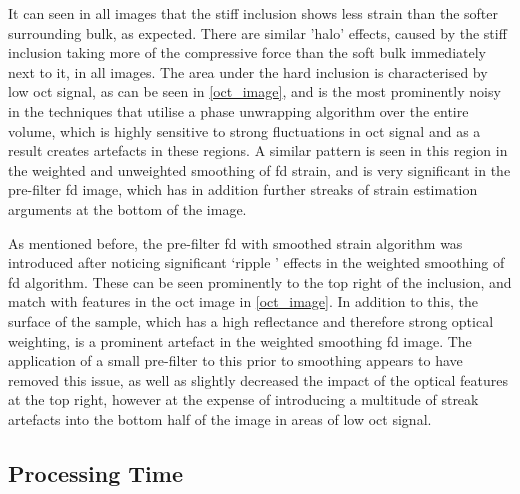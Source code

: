 It can seen in all images that the stiff inclusion shows less strain than the softer surrounding bulk, as expected. There are similar 'halo' effects, caused by the stiff inclusion taking more of the compressive force than the soft bulk immediately next to it, in all images. The area under the hard inclusion is characterised by low \ac{oct} signal, as can be seen in \autoref{oct_image}, and is the most prominently noisy in the techniques that utilise a phase unwrapping algorithm over the entire volume, which is highly sensitive to strong fluctuations in \ac{oct} signal and as a result creates artefacts in these regions. A similar pattern is seen in this region in the weighted and unweighted smoothing of \ac{fd} strain, and is very significant in the pre-filter \ac{fd} image, which has in addition further streaks of strain estimation arguments at the bottom of the image. 

As mentioned before, the pre-filter \ac{fd} with smoothed strain algorithm was introduced after noticing significant `ripple ' effects in the weighted smoothing of \ac{fd} algorithm. These can be seen prominently to the top right of the inclusion, and match with features in the \ac{oct} image in \autoref{oct_image}. In addition to this, the surface of the sample, which has a high reflectance and therefore strong optical weighting, is a  prominent artefact in the weighted smoothing \ac{fd} image. The application of a small pre-filter to this prior to smoothing appears to have removed this issue, as well as slightly decreased the impact of the optical features at the top right, however at the expense of introducing a multitude of streak artefacts into the bottom half of the image in areas of low \ac{oct} signal.

\subsection{Processing Time}

